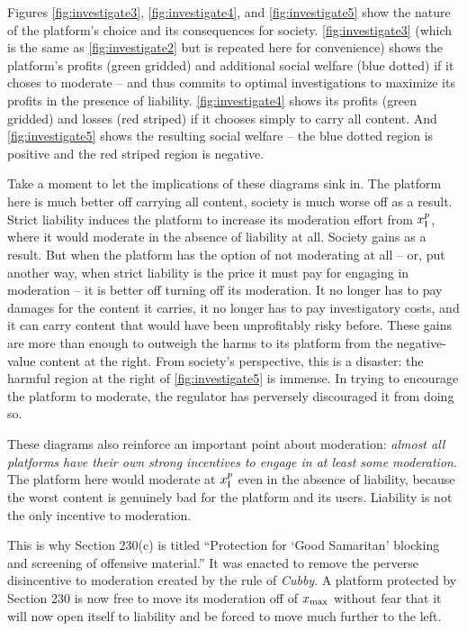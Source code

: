 Figures \ref{fig:investigate3}, \ref{fig:investigate4}, and \ref{fig:investigate5} show the nature of the platform's choice and its consequences for society. \autoref{fig:investigate3} (which is the same as \autoref{fig:investigate2} but is repeated here for convenience) shows the platform's profits (green gridded) and additional social welfare (blue dotted) if it choses to moderate -- and thus commits to optimal investigations to maximize its profits in the presence of liability. \autoref{fig:investigate4} shows its profits (green gridded) and losses (red striped) if it chooses simply to carry all content. And \autoref{fig:investigate5} shows the resulting social welfare -- the blue dotted region is positive and the red striped region is negative.

Take a moment to let the implications of these diagrams sink in. The platform here is much better off carrying all content, society is much worse off as a result. Strict liability induces the platform to increase its moderation effort from $x_{\text{I}}^p$, where it would moderate in the absence of liability at all. Society gains as a result. But when the platform has the option of not moderating at all -- or, put another way, when strict liability is the price it must pay for engaging in moderation -- it is better off turning off its moderation. It no longer has to pay damages for the content it carries, it no longer has to pay investigatory costs, and it can carry content that would have been unprofitably risky before. These gains are more than enough to outweigh the harms to its platform from the negative-value content at the right. From society's perspective, this is a disaster: the harmful region at the right of \autoref{fig:investigate5} is immense. In trying to encourage the platform to moderate, the regulator has perversely discouraged it from doing so.

These diagrams also reinforce an important point about moderation: \emph{almost all platforms have their own strong incentives to engage in at least some moderation}. The platform here would moderate at $x_{\text{I}}^p$ even in the absence of liability, because the worst content is genuinely bad for the platform and its users. Liability is not the only incentive to moderation.

This is why Section 230(c) is titled ``Protection for `Good Samaritan' blocking and screening of offensive material.'' It was enacted to remove the perverse disincentive to moderation created by the rule of \emph{Cubby}. A platform protected by Section 230 is now free to move its moderation off of $x_{\text{max}}$ without fear that it will now open itself to liability and be forced to move much further to the left.




